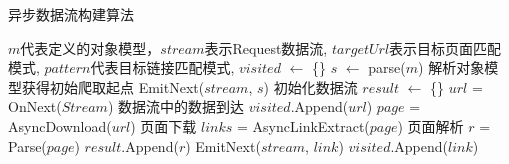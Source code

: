 \documentclass[master]{njuthesis}
\begin{document}
\begin{algorithm}[htbp]
 \caption{异步数据流构建算法}
 \label{algorithm}
 \begin{algorithmic}[1]
  \REQUIRE $m$代表定义的对象模型，$stream$表示Request数据流, $targetUrl$表示目标页面匹配模式, $pattern$代表目标链接匹配模式, 
  \STATE $visited$ $\gets$ \{\}
  \STATE $s$ $\gets$ parse($m$) 解析对象模型获得初始爬取起点
  \STATE EmitNext($stream$, $s$) 初始化数据流
  \STATE $result$  $\gets$ \{\}
    \STATE $url$ = OnNext($Stream$) 数据流中的数据到达
    \STATE $visited$.Append($url$)
    \STATE $page$ = AsyncDownload($url$) 页面下载
    \STATE $links$ = AsyncLinkExtract($page$) 页面解析
      \STATE $r$ = Parse($page$)
      \STATE $result$.Append($r$)
    \ENDIF
        \STATE EmitNext($stream$, $link$)
        \STATE $visited$.Append($link$)
      \ENDIF
    \ENDFOR
  \ENDWHILE
 \end{algorithmic}
\end{algorithm}





\end{document}
